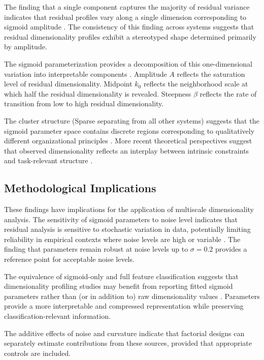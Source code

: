 The finding that a single component captures the majority of residual variance indicates that residual profiles vary along a single dimension corresponding to sigmoid amplitude \citep{stringer2019high}. The consistency of this finding across systems suggests that residual dimensionality profiles exhibit a stereotyped shape determined primarily by amplitude.

The sigmoid parameterization provides a decomposition of this one-dimensional variation into interpretable components \citep{hotz2023intrinsic}. Amplitude $A$ reflects the saturation level of residual dimensionality. Midpoint $k_0$ reflects the neighborhood scale at which half the residual dimensionality is revealed. Steepness $\beta$ reflects the rate of transition from low to high residual dimensionality.

The cluster structure (Sparse separating from all other systems) suggests that the sigmoid parameter space contains discrete regions corresponding to qualitatively different organizational principles \citep{gallego2017neural}. More recent theoretical perspectives suggest that observed dimensionality reflects an interplay between intrinsic constraints and task-relevant structure \citep{saxe2021if}.

\subsection{Methodological Implications}

These findings have implications for the application of multiscale dimensionality analysis. The sensitivity of sigmoid parameters to noise level indicates that residual analysis is sensitive to stochastic variation in data, potentially limiting reliability in empirical contexts where noise levels are high or variable \citep{coifman2006diffusion}. The finding that parameters remain robust at noise levels up to $\sigma = 0.2$ provides a reference point for acceptable noise levels.

The equivalence of sigmoid-only and full feature classification suggests that dimensionality profiling studies may benefit from reporting fitted sigmoid parameters rather than (or in addition to) raw dimensionality values \citep{paper3, paper4}. Parameters provide a more interpretable and compressed representation while preserving classification-relevant information.

The additive effects of noise and curvature indicate that factorial designs can separately estimate contributions from these sources, provided that appropriate controls are included.

